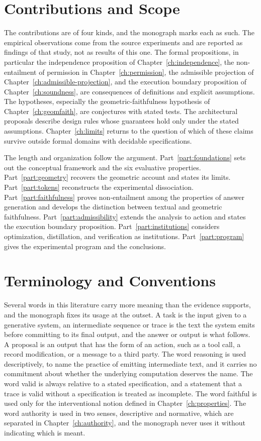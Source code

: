 \section{Contributions and Scope}

The contributions are of four kinds, and the monograph marks each as such. The empirical observations come from the source experiments and are reported as findings of that study, not as results of this one. The formal propositions, in particular the independence proposition of Chapter~\ref{ch:independence}, the non-entailment of permission in Chapter~\ref{ch:permission}, the admissible projection of Chapter~\ref{ch:admissible-projection}, and the execution boundary proposition of Chapter~\ref{ch:soundness}, are consequences of definitions and explicit assumptions. The hypotheses, especially the geometric-faithfulness hypothesis of Chapter~\ref{ch:geomfaith}, are conjectures with stated tests. The architectural proposals describe design rules whose guarantees hold only under the stated assumptions. Chapter~\ref{ch:limits} returns to the question of which of these claims survive outside formal domains with decidable specifications.

The length and organization follow the argument. Part~\ref{part:foundations} sets out the conceptual framework and the six evaluative properties. Part~\ref{part:geometry} recovers the geometric account and states its limits. Part~\ref{part:tokens} reconstructs the experimental dissociation. Part~\ref{part:faithfulness} proves non-entailment among the properties of answer generation and develops the distinction between textual and geometric faithfulness. Part~\ref{part:admissibility} extends the analysis to action and states the execution boundary proposition. Part~\ref{part:institutions} considers optimization, distillation, and verification as institutions. Part~\ref{part:program} gives the experimental program and the conclusions.

\section{Terminology and Conventions}

Several words in this literature carry more meaning than the evidence supports, and the monograph fixes its usage at the outset. A task is the input given to a generative system, an intermediate sequence or trace is the text the system emits before committing to its final output, and the answer or output is what follows. A proposal is an output that has the form of an action, such as a tool call, a record modification, or a message to a third party. The word reasoning is used descriptively, to name the practice of emitting intermediate text, and it carries no commitment about whether the underlying computation deserves the name. The word valid is always relative to a stated specification, and a statement that a trace is valid without a specification is treated as incomplete. The word faithful is used only for the interventional notion defined in Chapter~\ref{ch:properties}. The word authority is used in two senses, descriptive and normative, which are separated in Chapter~\ref{ch:authority}, and the monograph never uses it without indicating which is meant.

